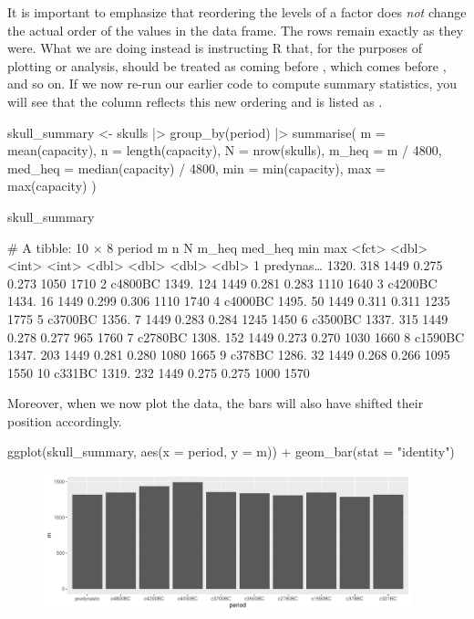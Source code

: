 It is important to emphasize that reordering the levels of a factor does \textit{not} change the actual order of the values in the data frame. The rows remain exactly as they were. What we are doing instead is instructing R that, for the purposes of plotting or analysis,  should be treated as coming before , which comes before , and so on. If we now re-run our earlier code to compute summary statistics, you will see that the  column reflects this new ordering and is listed as .

\begin{inR}
skull_summary <- skulls |>
  group_by(period) |>
  summarise(
    m = mean(capacity),
    n = length(capacity),
    N = nrow(skulls),
    m_heq = m / 4800,
    med_heq = median(capacity) / 4800,
    min = min(capacity),
    max = max(capacity)
  )

skull_summary
\end{inR}

\begin{outR}
# A tibble: 10 × 8
   period        m     n     N m_heq med_heq   min   max
   <fct>     <dbl> <int> <int> <dbl>   <dbl> <dbl> <dbl>
 1 predynas… 1320.   318  1449 0.275   0.273  1050  1710
 2 c4800BC   1349.   124  1449 0.281   0.283  1110  1640
 3 c4200BC   1434.    16  1449 0.299   0.306  1110  1740
 4 c4000BC   1495.    50  1449 0.311   0.311  1235  1775
 5 c3700BC   1356.     7  1449 0.283   0.284  1245  1450
 6 c3500BC   1337.   315  1449 0.278   0.277   965  1760
 7 c2780BC   1308.   152  1449 0.273   0.270  1030  1660
 8 c1590BC   1347.   203  1449 0.281   0.280  1080  1665
 9 c378BC    1286.    32  1449 0.268   0.266  1095  1550
10 c331BC    1319.   232  1449 0.275   0.275  1000  1570
\end{outR}

\noindent
Moreover, when we now plot the data, the bars will also have shifted their position accordingly.

\begin{inR}
ggplot(skull_summary, aes(x = period, y = m)) +
  geom_bar(stat = "identity")
\end{inR}

\vspace{2em}

\begin{figure}[H]
\includegraphics[width = 0.95\textwidth]{graphics/ch3Figs/bar_6.pdf}
\end{figure}

